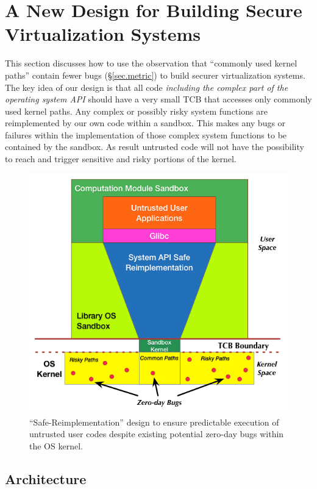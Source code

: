 \section{A New Design for Building Secure Virtualization Systems}
\label{sec.design}

This section discusses how to use the observation
 that ``commonly used kernel paths'' contain fewer bugs 
(\S{\ref{sec.metric}}) to build securer virtualization systems.
The key idea of our design is that all code \emph{including the complex part
of the operating system API} should have a very small TCB that accesses only 
commonly used kernel paths. 
Any complex or possibly risky system functions 
are reimplemented by our own code within a sandbox. This makes any bugs or failures within the implementation of those complex system functions 
to be contained by the sandbox. As result untrusted code will not have the possibility to reach 
and trigger sensitive and risky portions of the kernel. 


\begin{figure}%
\centering
\includegraphics[width=1.0\columnwidth]{diagram/lind_secure_design_new.png}
\caption{``Safe-Reimplementation'' design to ensure predictable execution of untrusted user codes despite existing potential zero-day bugs within the OS kernel.} 
\label{fig:design}
\end{figure}

\subsection{Architecture}

